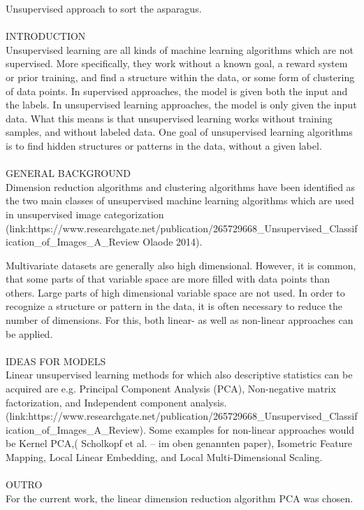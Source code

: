 Unsupervised approach to sort the asparagus. \\
\\
INTRODUCTION \\
Unsupervised learning are all kinds of machine learning algorithms which are not supervised.
More specifically, they work without a known goal, a reward system or prior training,
and find a structure within the data, or some form of clustering of data points.
In supervised approaches, the model is given both the input and the labels.
In unsupervised learning approaches, the model is only given the input data.
What this means is that unsupervised learning works without training samples,
and without labeled data. One goal of unsupervised learning algorithms is to find
hidden structures or patterns in the data, without a given label.  \\
\\
GENERAL BACKGROUND \\
Dimension reduction algorithms and clustering algorithms have been identified as the two main
classes of unsupervised machine learning algorithms which are used in unsupervised image
categorization (link:https://www.researchgate.net/publication/265729668_Unsupervised_Classification_of_Images_A_Review  Olaode 2014).

Multivariate datasets are generally also high dimensional. However, it is common,
that some parts of that variable space are more filled with data points than others.
Large parts of high dimensional variable space are not used. In order to recognize a
structure or pattern in the data, it is often necessary to reduce the number of dimensions.
For this, both linear- as well as non-linear approaches can be applied.\\
\\
IDEAS FOR MODELS \\
Linear unsupervised learning methods for which also descriptive statistics can be
acquired are e.g. Principal Component Analysis (PCA), Non-negative matrix
factorization, and Independent component analysis.
(link:https://www.researchgate.net/publication/265729668_Unsupervised_Classification_of_Images_A_Review).
Some examples for non-linear approaches would be Kernel PCA,( Scholkopf  et  al. – im oben genannten paper),
Isometric Feature Mapping, Local Linear Embedding, and Local Multi-Dimensional Scaling.\\
\\
OUTRO \\
For the current work, the linear dimension reduction algorithm PCA was chosen.\\
\\
